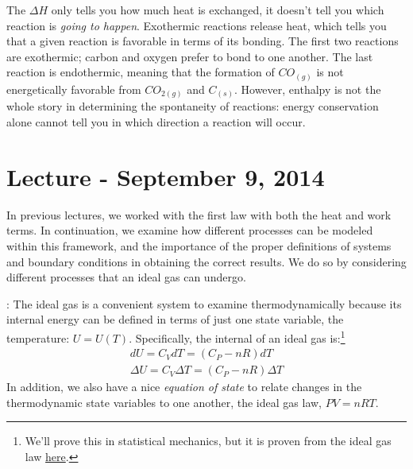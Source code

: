 \documentclass[12pt]{article}
\begin{document}
The $\Delta H$ only tells you how much heat is exchanged, it doesn't tell you which reaction is \emph{going to happen}. Exothermic reactions release heat, which tells you that a given reaction is favorable in terms of its bonding. The first two reactions are exothermic; carbon and oxygen prefer to bond to one another. The last reaction is endothermic, meaning that the formation of $CO_{(g)}$ is not energetically favorable from  $CO_{2 (g)}$ and $C_{(s)}$. However, enthalpy is not the whole story in determining the spontaneity of reactions: energy conservation alone cannot tell you in which direction a reaction will occur.

\section{Lecture - September 9, 2014}
In previous lectures, we worked with the first law with both the heat and work terms.  In continuation, we examine how different processes can be modeled within this framework, and the importance of the proper definitions of systems and boundary conditions in obtaining the correct results. We do so by considering different processes that an ideal gas can undergo.

:  The ideal gas is a convenient system to examine thermodynamically because its internal energy can be defined in terms of just one state variable, the temperature: $U = U(T)$. Specifically, the internal of an ideal gas is:\footnote{We'll prove this in statistical mechanics, but it is proven from the ideal gas law \href{http://pruffle.mit.edu/3.00/Lecture_11_web/node1.html}{here}.}
\begin{align*}
dU=C_V dT=(C_P-nR)dT\\
\Delta U=C_V \Delta T = (C_P-nR) \Delta T
\end{align*}
In addition, we also have a nice \emph{equation of state} to relate changes in the thermodynamic state variables to one another, the ideal gas law, $PV=nRT$.
\end{document}
